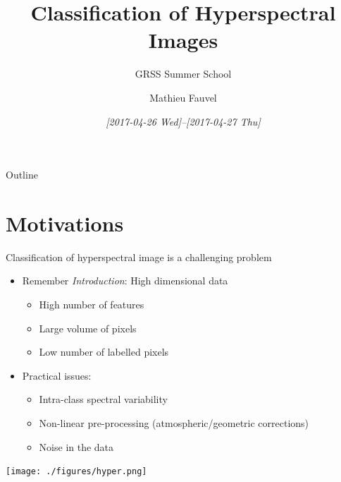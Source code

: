 \documentclass[10pt,aspectratio=1610,,color={dvipsnames,usenames,table},table]{beamer}
\author{Mathieu Fauvel}
\date{\textit{[2017-04-26 Wed]--[2017-04-27 Thu]}}
\title{Classification of Hyperspectral Images}
\subtitle{GRSS Summer School}
\institute{UMR Dynafor}
\begin{document}
\maketitle
\begin{frame}{Outline}
\tableofcontents
\end{frame}

\section{Motivations}
\label{sec:org947dec3}
\begin{frame}[label={sec:orga0e1854}]{Classification of hyperspectral image is a challenging problem}
\begin{itemize}
\item Remember \emph{Introduction}: \alert{High dimensional data}
\begin{itemize}
\item High number of features
\item Large volume of pixels
\item Low number of labelled pixels
\end{itemize}
\item Practical issues:
\begin{itemize}
\item Intra-class spectral variability
\item Non-linear pre-processing (atmospheric/geometric corrections)
\item Noise in the data
\end{itemize}
\end{itemize}

\begin{center}
\begin{center}
\texttt{[image: ./figures/hyper.png]}
\end{center}
\end{center}
\end{frame}
\end{document}
